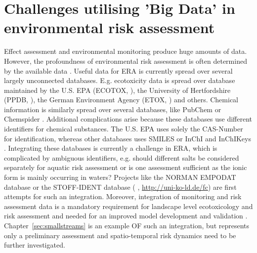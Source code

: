 \section{Challenges utilising 'Big Data' in environmental risk assessment}

Effect assessment and environmental monitoring produce huge amounts of data. 
However, the profoundness of environmental risk assessment is often determined by the available data \citep{van_den_brink_new_2016}.
Useful data for ERA is currently spread over several largely unconnected databases. 
E.g. ecotoxicity data is spread over database maintained by the U.S. EPA (ECOTOX, \citet{u.s._epa_ecotox_2016}), the University of Hertfordshire (PPDB, \citet{lewis_international_2016}), the German Environment Agency (ETOX, \citet{umweltbundesamt_etox:_2016}) and others. 
Chemical information is similarly spread over several databases, like PubChem \citep{kim_pubchem_2016} or Chemspider \citep{pence_chemspider:_2010}.
Additional complications arise because these databases use different identifiers for chemical substances. 
The U.S. EPA \citep{u.s._epa_ecotox_2016} uses solely the CAS-Number for identification, whereas other databases uses SMILES \citep{weininger_smiles._1990} or InChI and InChIKeys \citep{heller_inchi_2015}. 
Integrating these databases is currently a challenge in ERA, which is complicated by ambiguous identifiers, e.g. should different salts be considered separately for aquatic risk assessment or is one assessment sufficient as the ionic form is mainly occurring in waters?
Projects like the NORMAN EMPODAT database \citep{brack_norman_2012} or the STOFF-IDENT database (\citeauthor{huckele_risk_2013} \cite*{huckele_risk_2013}, \url{http://uni-ko-ld.de/fc}) are first attempts for such an integration.
Moreover, integration of monitoring and risk assessment data is a mandatory requirement for landscape level ecotoxicology and risk assessment \citep{focks_challenge:_2014} and needed for an improved model development and validation \citep{knabel_regulatory_2012, brock_aquatic_2006}. 
Chapter~\ref{sec:smallstreams} is an example OF such an integration, but represents only a preliminary assessment and spatio-temporal risk dynamics need to be further investigated. 

